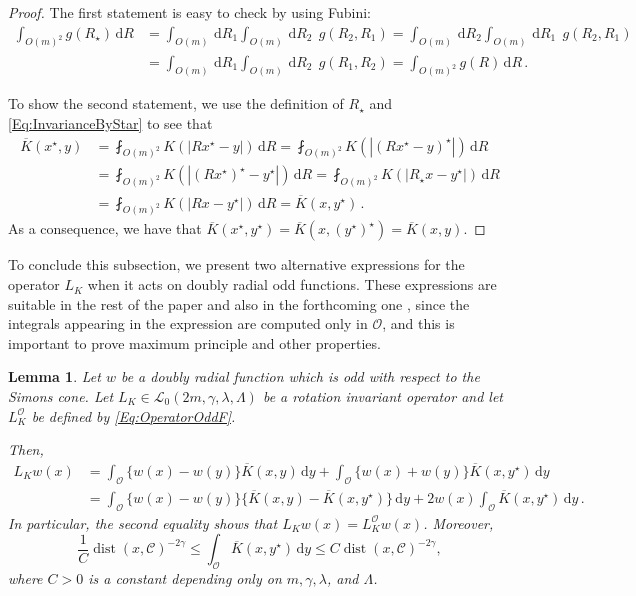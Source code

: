 \documentclass[12pt,reqno]{amsart}
\newtheorem{lemma}[theorem]{Lemma}
\theoremstyle{definition}
\theoremstyle{remark}
\newcommand{\ccal}{\mathscr{C}}
\newcommand{\lcal}{\mathcal{L}}
\newcommand{\ocal}{\mathcal{O}}
\newcommand{\s}{\gamma}
\renewcommand{\d}{\,\mathrm{d}} %
\newcommand{\average}{\fint}
\DeclareMathOperator{\dist}{dist}
\numberwithin{equation}{section}
\begin{document}
	\begin{proof}
		The first statement is easy to check by using Fubini:
		\begin{align*}
		\int_{O(m)^2} g(R_\star) \d R & = \int_{O(m)} \!\! \d R_1 \int_{O(m)} \!\! \d R_2 \ \ g(R_2, R_1)  =  \int_{O(m)} \!\! \d R_2 \int_{O(m)} \!\! \d R_1 \ \ g(R_2, R_1) \\
		& =  \int_{O(m)} \!\! \d R_1 \int_{O(m)} \!\! \d R_2 \ \ g(R_1, R_2)  =  \int_{O(m)^2} g(R) \d R\,.
		\end{align*}
		
		To show the second statement, we use the definition of $R_\star$ and \eqref{Eq:InvarianceByStar}
		to see that
		\begin{align*}
		\overline{K}(x^\star,y) &= \average_{O(m)^2} K(|Rx^\star - y|) \d R = \average_{O(m)^2} K(|(Rx^\star - y)^\star|) \d R \\
		&= \average_{O(m)^2} K(|(R x^\star)^\star - y^\star|) \d R = \average_{O(m)^2} K(|R_\star x - y^\star|) \d R \\
		&= \average_{O(m)^2} K(|Rx - y^\star|) \d R = \overline{K}(x,y^\star)\,.
		\end{align*}
		As a consequence, we have that $\overline{K}(x^\star,y^\star) = \overline{K}(x,(y^\star)^\star) = \overline{K}(x,y)$.
	\end{proof}
	
	To conclude this subsection, we present two alternative expressions for the operator $L_K$ when it acts on doubly radial odd functions. These expressions are suitable in the rest of the paper and also in the forthcoming one \cite{FelipeSanz-Perela:IntegroDifferentialII}, since the integrals appearing in the expression are computed only in $\ocal$, and this is important to prove maximum principle and other properties.
	
	\begin{lemma}
		\label{Lemma:OperatorOddF}
		Let $w$ be a doubly radial function which is odd with respect to the Simons cone. Let $L_K \in \lcal_0(2m,\s,\lambda, \Lambda)$ be a rotation invariant operator and let $L_K^\ocal$ be defined by \eqref{Eq:OperatorOddF}. 
		
		Then, 
		\begin{align*}
		L_K w (x) &= \int_{\ocal} \{w(x) - w(y) \} \overline{K}(x, y) \d y +  \int_{\ocal} \{w(x) + w(y) \} \overline{K}(x, y^\star) \d y \\
		&= \int_{\ocal} \{w(x) - w(y) \} \{\overline{K}(x, y) - \overline{K}(x, y^\star)  \} \d y +  2 w(x) \int_{\ocal} \overline{K}(x, y^\star) \d y \,.
		\end{align*}
		In particular, the second equality shows that $L_K w (x) = L_K^\ocal w(x)$. 	Moreover,
		\begin{equation}
		\label{Eq:ZeroOrderTerm}
		\dfrac{1}{C} \dist(x,\ccal)^{-2\s} \leq \int_{\ocal} \overline{K}(x, y^\star) \d y \leq C \dist(x,\ccal)^{-2\s},
		\end{equation}
		where $C>0$ is a constant depending only on $m, \s, \lambda$, and $\Lambda$.
	\end{lemma}
	
\end{document}
